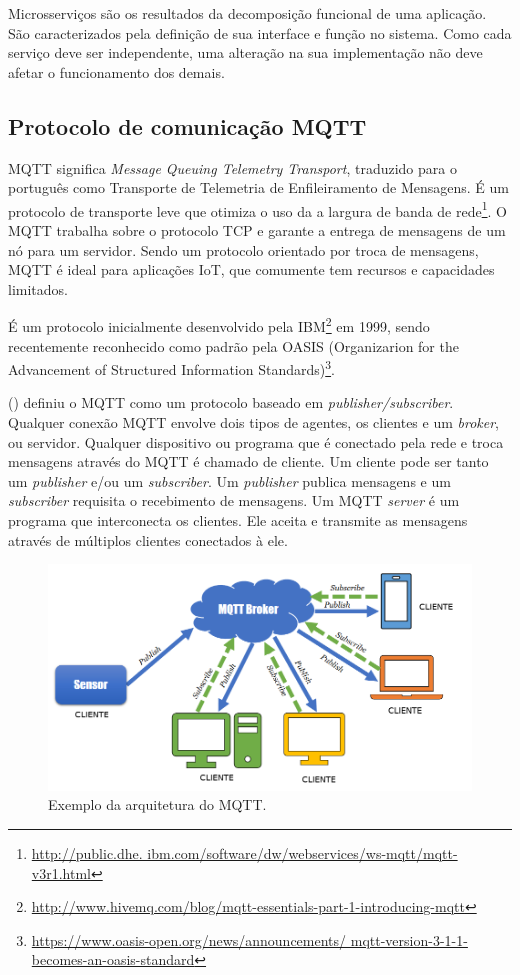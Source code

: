 Microsserviços são os resultados da decomposição funcional de uma aplicação. São caracterizados pela definição de sua interface e função no sistema. Como cada serviço deve ser independente, uma alteração na sua implementação não deve afetar o funcionamento dos demais. \cite{Pahl}

\subsection{Protocolo de comunicação MQTT}

MQTT significa \textit{Message Queuing Telemetry Transport}, traduzido para o português como Transporte de Telemetria de Enfileiramento de Mensagens. É um protocolo de transporte leve que otimiza o uso da a largura de banda de rede\footnote{\url{http://public.dhe. ibm.com/software/dw/webservices/ws-mqtt/mqtt-v3r1.html}}. O MQTT trabalha sobre o protocolo TCP e garante a entrega de mensagens de um nó para um servidor. Sendo um protocolo orientado por troca de mensagens, MQTT é ideal para aplicações IoT, que comumente tem recursos e capacidades limitados.

É um protocolo inicialmente desenvolvido pela IBM\footnote{\url{http://www.hivemq.com/blog/mqtt-essentials-part-1-introducing-mqtt}} em 1999, sendo recentemente reconhecido como padrão pela OASIS (Organizarion for the Advancement of Structured Information Standards)\footnote{\url{https://www.oasis-open.org/news/announcements/ mqtt-version-3-1-1-becomes-an-oasis-standard}}.

\citeauthor{Kodali2017} (\citeyear{Kodali2017}) definiu o MQTT como um protocolo baseado em \textit {publisher/subscriber}. Qualquer conexão MQTT envolve dois tipos de agentes, os clientes e um \textit {broker}, ou servidor. Qualquer dispositivo ou programa que é conectado pela rede e troca mensagens através do MQTT é chamado de cliente. Um cliente pode ser tanto um \textit {publisher} e/ou um \textit {subscriber}. Um \textit {publisher} publica mensagens e um \textit {subscriber} requisita o recebimento de mensagens. Um MQTT \textit {server} é um programa que interconecta os clientes. Ele aceita e transmite as mensagens através de múltiplos clientes conectados à ele.

\begin{figure}[htbp]
	\centering
	\includegraphics[width=1\linewidth]{figuras/mqtt-architecture.png}
	\caption{Exemplo da arquitetura do MQTT.}
	\label{fig:arquitetura-mqtt}
\end{figure}


